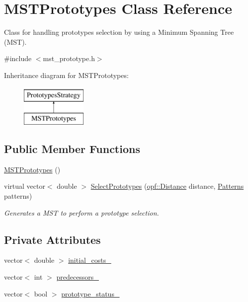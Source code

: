 \hypertarget{classMSTPrototypes}{\section{M\+S\+T\+Prototypes Class Reference}
\label{classMSTPrototypes}
}


Class for handling prototypes selection by using a Minimum Spanning Tree (M\+S\+T).  




{\ttfamily \#include $<$mst\+\_\+prototype.\+h$>$}

Inheritance diagram for M\+S\+T\+Prototypes\+:\begin{figure}[H]
\begin{center}
\leavevmode
\includegraphics[height=2.000000cm]{classMSTPrototypes}
\end{center}
\end{figure}
\subsection*{Public Member Functions}
\begin{DoxyCompactItemize}
\item 
\hyperlink{classMSTPrototypes_a62fedec88ad4ab417181fbc672f72410}{M\+S\+T\+Prototypes} ()
\item 
virtual vector$<$ double $>$ \hyperlink{classMSTPrototypes_a654ccbaebfdbca73a0da0e5eb1e4e39f}{Select\+Prototypes} (\hyperlink{namespaceopf_a61631393754e0aa6aaeacf0767b2b419}{opf\+::\+Distance} distance, \hyperlink{classPatterns}{Patterns} patterns)
\begin{DoxyCompactList}\small\item\em Generates a M\+S\+T to perform a prototype selection. \end{DoxyCompactList}\end{DoxyCompactItemize}
\subsection*{Private Attributes}
\begin{DoxyCompactItemize}
\item 
vector$<$ double $>$ \hyperlink{classMSTPrototypes_a2674e0559c35f64871c6f3d43c05bbb3}{initial\+\_\+costs\+\_\+}
\item 
vector$<$ int $>$ \hyperlink{classMSTPrototypes_a797e22614528dd54cafeaaa8d67dba4d}{predecessors\+\_\+}
\item 
vector$<$ bool $>$ \hyperlink{classMSTPrototypes_af2f3546aaad6bce57f5b9db34f38be37}{prototype\+\_\+status\+\_\+}
\end{DoxyCompactItemize}
